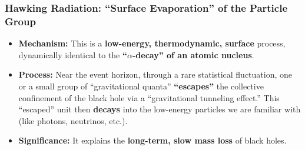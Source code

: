 \documentclass[11pt, a4paper]{article}
\begin{document}
\subsubsection{Hawking Radiation: ``Surface Evaporation'' of the Particle Group}
\begin{itemize}
    \item \textbf{Mechanism:} This is a \textbf{low-energy, thermodynamic, surface} process, dynamically identical to the \textbf{``$\alpha$-decay'' of an atomic nucleus}.
    \item \textbf{Process:} Near the event horizon, through a rare statistical fluctuation, one or a small group of ``gravitational quanta'' \textbf{``escapes''} the collective confinement of the black hole via a ``gravitational tunneling effect.'' This ``escaped'' unit then \textbf{decays} into the low-energy particles we are familiar with (like photons, neutrinos, etc.).
    \item \textbf{Significance:} It explains the \textbf{long-term, slow mass loss} of black holes.
\end{itemize}
\end{document}
